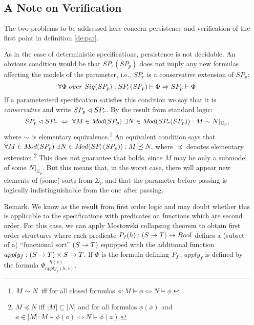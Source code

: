 \subsection{A Note on Verification}\label{sub:ver} The two problems to be addressed here concern persistence and verification of the first point in definition \ref{de:par}. 

As in the case of deterministic specifications, persistence is not decidable. An obvious condition would be that $SP_r(SP_p)$ 
does not imply any
new formulas affecting the models of the parameter, i.e., $SP_r$ is a conservative extension of $SP_p$:
\begin{equation}\label{eq:conservative}
\forall \Phi\ over\ Sig(SP_p) :
SP_r(SP_p)\vdash \Phi\mathrel\Rightarrow SP_p\vdash \Phi \end{equation}
If a parameterised specification satisfies this condition we say that it is {\em conservative} and write $SP_p\lhd SP_r$. By the result from standard logic: %
\begin{equation}\label{eq:cons}
SP_p\lhd SP_r\ \mathrel{\Leftrightarrow}\
\forall M\in M\!od(SP_p)\ \exists N\in M\!od(SP_r(SP_p)): M\sim N|_{\Sigma_{p}},
\end{equation}
where $\sim$ is elementary equivalence.\footnote{$M\sim N$ iff for all closed
formulas $\phi: M\models\phi\iff N\models\phi$.} An equivalent condition says that $\forall M\in M\!od(SP_p)\ \exists N\in M\!od(SP_r(SP_p)) : M\preceq N,$ where $\preceq$ denotes elementary extension.\footnote{$M\preceq N$ iff $|M|\subseteq |N|$ and for all formulas $\phi(\overline x)$ and $\overline a \in |M|: M\models \phi(\overline a) \iff N\models\phi(\overline a).$}
This does not guarantee that \re{eq:pers} holds, since $M$ may be only a submodel of some $N|_{\Sigma_{p}}$. But this means that, in the worst case, there will appear new elements of (some) sorts from $\Sigma_p$ and that the parameter before passing is logically indistinguishable from the one after passing.
\begin{SREMARK}{Remark.}
We know  as the result from first order logic and may doubt whether this is applicable to the specifications with predicates on functions which are second order. For this case, we can apply Mostowski collapsing theorem
to obtain first order structures where each predicate $P_{f}(h):(S\rightarrow T)\rightarrow Bool$ defines a (subset of a) ``functional sort'' $(S\rightarrow T)$ equipped
with the additional function $apply_f:(S\rightarrow T)\times S\rightarrow T$. If $\Phi$ is the formula defining $P_{f}$, $apply_f$ is defined by the formula $\Phi_{apply_{f}(h,\overline s)}^{\ \ \ \ h(\overline s)}$. \end{SREMARK}
